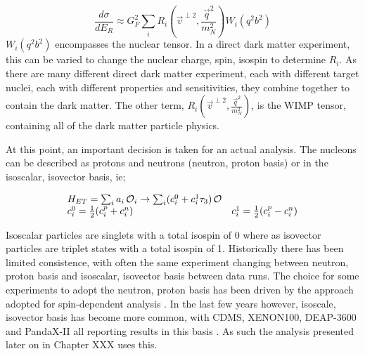 \begin{equation}
    \frac{d\sigma}{dE_R} \approx G_F^2 \sum_{i} R_i (\vec{v}^{\perp 2}, \frac{\vec{q}^2}{m_N^2}) W_i(q^2b^2)
\end{equation}
$W_i(q^2b^2)$ encompasses the nuclear tensor.
In a direct dark matter experiment, this can be varied to change the nuclear charge, spin, isospin to determine $R_i$.
As there are many different direct dark matter experiment, each with different target nuclei, each with different properties and sensitivities, they combine together to contain the dark matter.
The other term, $R_i (\vec{v}^{\perp 2}, \frac{\vec{q}^2}{m_N^2})$, is the WIMP tensor, containing all of the dark matter particle physics.



\par
At this point, an important decision is taken for an actual analysis.
The nucleons can be described as protons and neutrons ({neutron, proton} basis) or in the {isoscalar, isovector} basis, ie;

\begin{equation}
\begin{array}{lcl}
    H_{ET} = \sum_i a_i \operatorname{\mathcal{O}}_i \rightarrow \sum_i (c_i^0 + c_i^1 \tau_3)\operatorname{\mathcal{O}} \\
    c_i^0 = \frac{1}{2}(c_i^p + c_i^n) & c_i^1 = \frac{1}{2}(c_i^p - c_i^n)
\end{array}
\label{eq:EFT_Operators}
\end{equation}

Isoscalar particles are singlets with a total isospin of 0 where as isovector particles are triplet states with a total isospin of 1.
Historically there has been limited consistence, with often the same experiment changing between {neutron, proton} basis and {isoscalar, isovector} basis between data runs.
The choice for some experiments to adopt the {neutron, proton} basis has been driven by the approach adopted for spin-dependent analysis .
In the last few years however, {isoscale, isovector} basis has become more common, with CDMS, XENON100, DEAP-3600 and PandaX-II all reporting results in this basis \cite{cdms_eft_ref,xenon100_eft_ref,deap3600_eft_ref,pandax_2_eft_ref}.
As such the analysis presented later on in Chapter XXX uses this.



